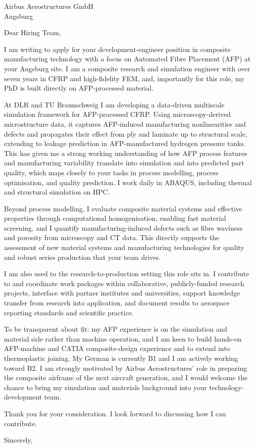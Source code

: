 \documentclass[10pt]{letter}
\begin{document}
\begin{letter}{Airbus Aerostructures GmbH \\ Augsburg}
\opening{Dear Hiring Team,}

I am writing to apply for your development-engineer position in composite manufacturing technology with a focus on Automated Fibre Placement (AFP) at your Augsburg site. I am a composite research and simulation engineer with over seven years in CFRP and high-fidelity FEM, and, importantly for this role, my PhD is built directly on AFP-processed material.

At DLR and TU Braunschweig I am developing a data-driven multiscale simulation framework for AFP-processed CFRP. Using microscopy-derived microstructure data, it captures AFP-induced manufacturing nonlinearities and defects and propagates their effect from ply and laminate up to structural scale, extending to leakage prediction in AFP-manufactured hydrogen pressure tanks. This has given me a strong working understanding of how AFP process features and manufacturing variability translate into simulation and into predicted part quality, which maps closely to your tasks in process modelling, process optimisation, and quality prediction. I work daily in ABAQUS, including thermal and structural simulation on HPC.

Beyond process modelling, I evaluate composite material systems and effective properties through computational homogenisation, enabling fast material screening, and I quantify manufacturing-induced defects such as fibre waviness and porosity from microscopy and CT data. This directly supports the assessment of new material systems and manufacturing technologies for quality and robust series production that your team drives.

I am also used to the research-to-production setting this role sits in. I contribute to and coordinate work packages within collaborative, publicly-funded research projects, interface with partner institutes and universities, support knowledge transfer from research into application, and document results to aerospace reporting standards and scientific practice.

To be transparent about fit: my AFP experience is on the simulation and material side rather than machine operation, and I am keen to build hands-on AFP-machine and CATIA composite-design experience and to extend into thermoplastic joining. My German is currently B1 and I am actively working toward B2. I am strongly motivated by Airbus Aerostructures' role in preparing the composite airframe of the next aircraft generation, and I would welcome the chance to bring my simulation and materials background into your technology-development team.

Thank you for your consideration. I look forward to discussing how I can contribute.

\closing{Sincerely,}
\end{letter}
\end{document}
